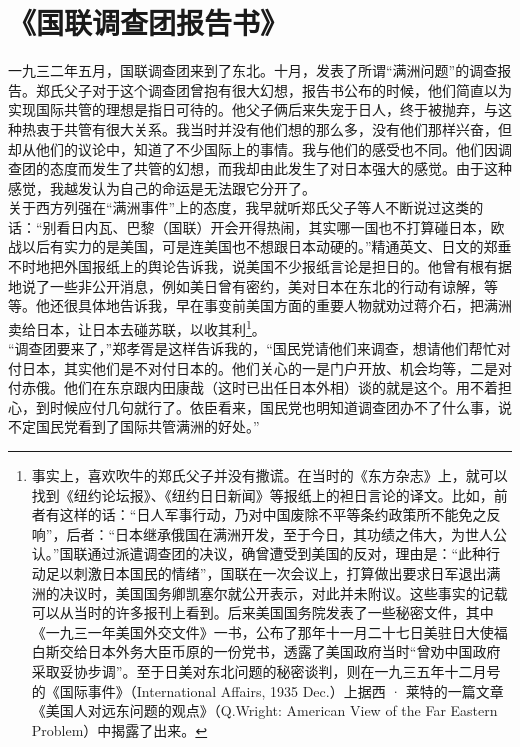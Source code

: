 \fancyhead[RO]{} %
\fancyhead[LE]{} %
\chapter*{《国联调查团报告书》}
\thispagestyle{empty}
一九三二年五月，国联调查团来到了东北。十月，发表了所谓“满洲问题”的调查报告。郑氏父子对于这个调查团曾抱有很大幻想，报告书公布的时候，他们简直以为实现国际共管的理想是指日可待的。他父子俩后来失宠于日人，终于被抛弃，与这种热衷于共管有很大关系。我当时并没有他们想的那么多，没有他们那样兴奋，但却从他们的议论中，知道了不少国际上的事情。我与他们的感受也不同。他们因调查团的态度而发生了共管的幻想，而我却由此发生了对日本强大的感觉。由于这种感觉，我越发认为自己的命运是无法跟它分开了。\\

关于西方列强在“满洲事件”上的态度，我早就听郑氏父子等人不断说过这类的话：“别看日内瓦、巴黎（国联）开会开得热闹，其实哪一国也不打算碰日本，欧战以后有实力的是美国，可是连美国也不想跟日本动硬的。”精通英文、日文的郑垂不时地把外国报纸上的舆论告诉我，说美国不少报纸言论是担日的。他曾有根有据地说了一些非公开消息，例如美日曾有密约，美对日本在东北的行动有谅解，等等。他还很具体地告诉我，早在事变前美国方面的重要人物就劝过蒋介石，把满洲卖给日本，让日本去碰苏联，以收其利\footnote{事实上，喜欢吹牛的郑氏父子并没有撒谎。在当时的《东方杂志》上，就可以找到《纽约论坛报》、《纽约日日新闻》等报纸上的袒日言论的译文。比如，前者有这样的话：“日人军事行动，乃对中国废除不平等条约政策所不能免之反响”，后者：“日本继承俄国在满洲开发，至于今日，其功绩之伟大，为世人公认。”国联通过派遣调查团的决议，确曾遭受到美国的反对，理由是：“此种行动足以刺激日本国民的情绪”，国联在一次会议上，打算做出要求日军退出满洲的决议时，美国国务卿凯塞尔就公开表示，对此并未附议。这些事实的记载可以从当时的许多报刊上看到。后来美国国务院发表了一些秘密文件，其中《一九三一年美国外交文件》一书，公布了那年十一月二十七日美驻日大使福白斯交给日本外务大臣币原的一份党书，透露了美国政府当时“曾劝中国政府采取妥协步调”。至于日美对东北问题的秘密谈判，则在一九三五年十二月号的《国际事件》（International Affairs, 1935 Dec.）上据西 · 莱特的一篇文章《美国人对远东问题的观点》（Q.Wright: American View of the Far Eastern Problem）中揭露了出来。}。\\

“调查团要来了，”郑孝胥是这样告诉我的，“国民党请他们来调查，想请他们帮忙对付日本，其实他们是不对付日本的。他们关心的一是门户开放、机会均等，二是对付赤俄。他们在东京跟内田康哉（这时已出任日本外相）谈的就是这个。用不着担心，到时候应付几句就行了。依臣看来，国民党也明知道调查团办不了什么事，说不定国民党看到了国际共管满洲的好处。”\\

